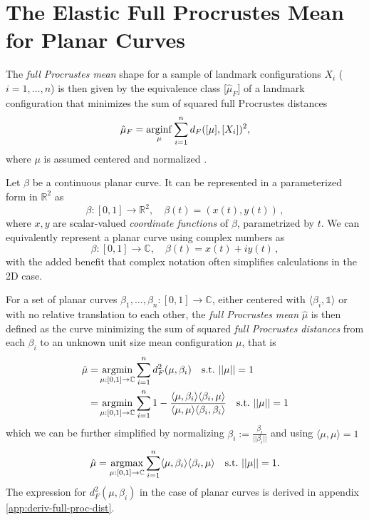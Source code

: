 \newpage
\section{The Elastic Full Procrustes Mean for Planar Curves}

\begin{definition}
    The \emph{full Procrustes mean} shape for a sample of landmark
    configurations $X_i$ ($i = 1,\dots,n$) is then given by the equivalence
    class [$\hat\mu_F$] of a landmark configuration that minimizes the sum of
    squared full Procrustes distances
    $$\hat{\mu}_F = \operatorname*{arginf}_{\mu} \sum_{i=1}^n d_F([\mu], [X_i])^2, $$
    where $\mu$ is assumed centered and normalized
    \parencites[see][71,114]{DrydenMardia2016}.
\end{definition}

Let $\beta$ be a continuous planar curve.
It can be represented in a parameterized form in $\mathbb{R}^2$ as
$$ \beta : [0,1] \rightarrow \mathbb{R}^2,\quad \beta(t) = ( x(t), y(t)) \,, $$
where $x, y$ are scalar-valued \textit{coordinate functions} of $\beta$, parametrized by $t$.
We can equivalently represent a planar curve using complex numbers as
$$ \beta : [0,1] \rightarrow \mathbb{C},\quad \beta(t) = x(t) + iy(t) \,, $$
with the added benefit that complex notation often simplifies calculations in the 2D case.

For a set of planar curves $\beta_1,\dots,\beta_n : [0,1] \rightarrow \mathbb{C}$, either centered with $\langle \beta_i, \mathbb{1} \rangle$ or with no relative translation to each other, the \textit{full Procrustes mean} $\hat{\mu}$ is then defined as the curve minimizing the sum of squared \textit{full Procrustes distances} from each $\beta_i$ to an unknown unit size mean configuration $\mu$, that is
\begin{align*}
    \hat{\mu} =& \operatorname*{argmin}_{\mu:[0,1]\rightarrow\mathbb{C}} \sum_{i=1}^n d^2_F(\mu,\beta_i)
    \quad\text{s.t.}\,\, ||\mu|| = 1 \\
    =& \operatorname*{argmin}_{\mu:[0,1]\rightarrow\mathbb{C}} \sum_{i=1}^n 1 - \frac{\langle \mu, \beta_i \rangle \langle \beta_i, \mu \rangle}{\langle \mu, \mu \rangle \langle \beta_i, \beta_i \rangle}
    \quad\text{s.t.}\,\, ||\mu|| = 1
\end{align*}
which we can be further simplified by normalizing $\beta_i := \frac{\beta_i}{|| \beta_i ||}$ and using $\langle \mu, \mu \rangle = 1$
$$ \hat{\mu} = \operatorname*{argmax}_{\mu:[0,1]\rightarrow\mathbb{C}} \sum_{i=1}^n \langle \mu, \beta_i \rangle \langle \beta_i, \mu \rangle \quad\text{s.t.}\,\, ||\mu|| = 1. $$
The expression for $d^2_F(\mu,\beta_i)$ in the case of planar curves is derived in appendix \ref{app:deriv-full-proc-dist}.



